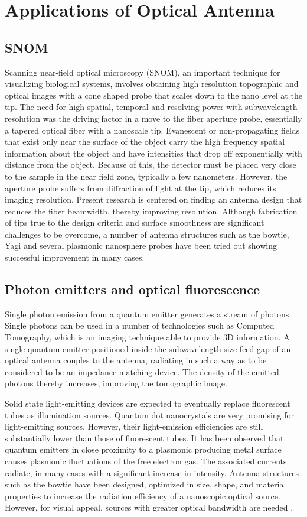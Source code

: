 \documentclass[11pt]{article}
\begin{document}
\section{Applications of Optical Antenna}
\subsection{SNOM}
%
Scanning near-field optical microscopy (SNOM), an important technique for visualizing biological systems, involves obtaining high resolution topographic and optical images with a cone shaped probe that scales down to the nano level at the tip. The need for high spatial, temporal and resolving power with subwavelength resolution was the driving factor in a move to the fiber aperture probe, essentially a tapered optical fiber with a nanoscale tip.  Evanescent or non-propagating fields that exist only near the surface of the object carry the high frequency spatial information about the object and have intensities that drop off exponentially with distance from the object. Because of this, the detector must be placed very close to the sample in the near field zone, typically a few nanometers. However, the aperture probe suffers from diffraction of light at the tip, which reduces its imaging resolution. Present research is centered on finding an antenna design that reduces the fiber beamwidth, thereby improving resolution. Although fabrication of tips true to the design criteria and surface smoothness are significant challenges to be overcome, a number of antenna structures such as the bowtie, Yagi and several plasmonic nanosphere probes have been tried out showing successful improvement in many cases.
\subsection{Photon emitters and optical fluorescence}
%
Single photon emission from a quantum emitter generates a stream of photons. Single photons can be used in a number of technologies such as Computed Tomography, which is an imaging technique able to provide 3D information. A single quantum emitter positioned inside the subwavelength size feed gap of an optical antenna couples to the antenna, radiating in such a way as to be considered to be an impedance matching device. The density of the emitted photons thereby increases, improving the tomographic image.

Solid state light-emitting devices are expected to eventually replace fluorescent tubes as illumination sources. Quantum dot nanocrystals are very promising for light-emitting sources. However, their light-emission efficiencies are still substantially lower than those of fluorescent tubes. It has been observed that quantum emitters in close proximity to a plasmonic producing metal surface causes plasmonic fluctuations of the free electron gas. The associated currents radiate, in many cases with a significant increase in intensity. Antenna structures such as the bowtie have been designed, optimized in size, shape, and material properties to increase the radiation efficiency of a nanoscopic optical source. However, for visual appeal, sources with greater optical bandwidth are needed \cite{farahani,Curto2010}.
\end{document}
